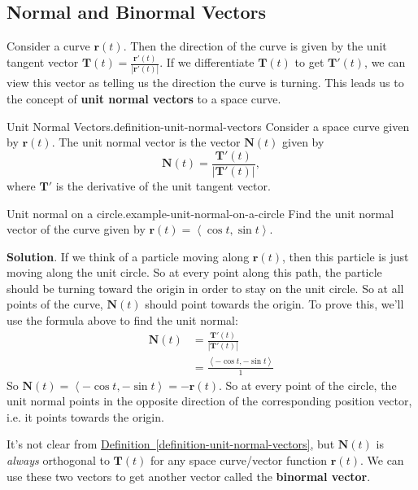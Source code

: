 \documentclass[10pt,]{book}
\newcommand{\terminology}[1]{\textbf{#1}}
\numberwithin{equation}{section}
\newcommand{\vv}[1]{\mathbf{#1}}
\newcommand{\dotprod}[1]{\left\langle #1 \right\rangle}
\begin{document}
\subsection[{Normal and Binormal Vectors}]{Normal and Binormal Vectors}\label{subsection-normal-and-binormal-vectors}
\hypertarget{p-1298}{}%
Consider a curve \(\vv{r}(t)\). Then the direction of the curve is given by the unit tangent vector \(\vv{T}(t) = \frac{\vv{r}'(t)}{|\vv{r}'(t)|}\). If we differentiate \(\vv{T}(t)\) to get \(\vv{T}'(t)\), we can view this vector as telling us the direction the curve is turning. This leads us to the concept of \terminology{unit normal vectors} to a space curve.%
\begin{definition}{Unit Normal Vectors.}{definition-unit-normal-vectors}%
\hypertarget{p-1299}{}%
Consider a space curve given by \(\vv{r}(t)\). The unit normal vector is the vector \(\vv{N}(t)\) given by%
%
\begin{equation*}
\vv{N}(t) = \frac{\vv{T}'(t)}{|\vv{T}'(t)|},
\end{equation*}
\hypertarget{p-1300}{}%
where \(\vv{T}'\) is the derivative of the unit tangent vector.%
\end{definition}
\begin{example}{Unit normal on a circle.}{example-unit-normal-on-a-circle}%
\hypertarget{p-1301}{}%
Find the unit normal vector of the curve given by \(\vv{r}(t) = \dotprod{\cos t,\sin t}\).%
\par\smallskip%
\noindent\textbf{Solution}.\hypertarget{solution-208}{}\quad%
\hypertarget{p-1302}{}%
If we think of a particle moving along \(\vv{r}(t)\), then this particle is just moving along the unit circle. So at every point along this path, the particle should be turning toward the origin in order to stay on the unit circle. So at all points of the curve, \(\vv{N}(t)\) should point towards the origin. To prove this, we'll use the formula above to find the unit normal:%
%
\begin{align*}
\vv{N}(t) & = \frac{\vv{T}'(t)}{|\vv{T}'(t)|} \\
& = \frac{\dotprod{-\cos t, -\sin t}}{1} 
\end{align*}
\hypertarget{p-1303}{}%
So \(\vv{N}(t) = \dotprod{-\cos t, -\sin t} = -\vv{r}(t)\). So at every point of the circle, the unit normal points in the opposite direction of the corresponding position vector, i.e. it points towards the origin.%
\end{example}
\hypertarget{p-1304}{}%
It's not clear from \hyperref[definition-unit-normal-vectors]{Definition~\ref{definition-unit-normal-vectors}}, but \(\vv{N}(t)\) is \emph{always} orthogonal to \(\vv{T}(t)\) for any space curve/vector function \(\vv{r}(t)\). We can use these two vectors to get another vector called the \terminology{binormal vector}.%
\end{document}
